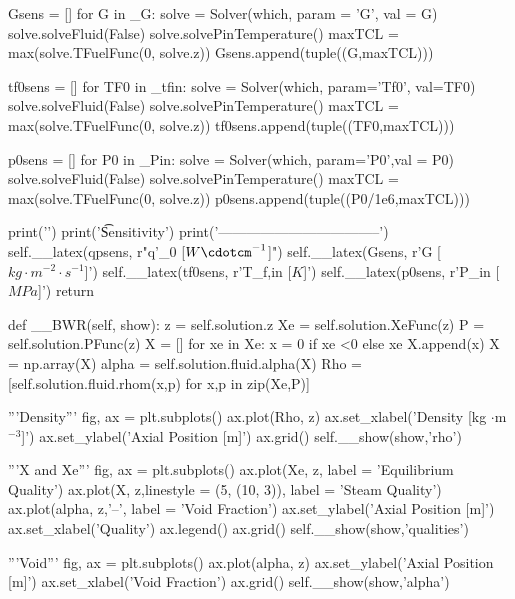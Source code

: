 \documentclass{article}
\begin{document}
\begin{python}
        Gsens = []
        for G in _G:
            solve = Solver(which, param = 'G', val = G)
            solve.solveFluid(False)
            solve.solvePinTemperature()
            maxTCL = max(solve.TFuelFunc(0, solve.z))
            Gsens.append(tuple((G,maxTCL)))

        tf0sens = []
        for TF0 in _tfin:
            solve = Solver(which, param='Tf0', val=TF0)
            solve.solveFluid(False)
            solve.solvePinTemperature()
            maxTCL = max(solve.TFuelFunc(0, solve.z))
            tf0sens.append(tuple((TF0,maxTCL)))
        
        p0sens = []
        for P0 in _Pin:
            solve = Solver(which, param='P0',val = P0)
            solve.solveFluid(False)
            solve.solvePinTemperature()
            maxTCL = max(solve.TFuelFunc(0, solve.z))
            p0sens.append(tuple((P0/1e6,maxTCL)))

        print('\n\n')
        print('\t    Sensitivity')
        print('-----------------------------------')
        self.__latex(qpsens, r"q'_{0}  [$W\cdotcm^{-1}$]")
        self.__latex(Gsens, r'G  [$kg\cdot m^{-2} \cdot s^{-1}$]')
        self.__latex(tf0sens, r'T_{f,in}  [$K$]')
        self.__latex(p0sens, r'P_{in}  [$MPa$]')
        return
    
    def __BWR(self, show):
        z = self.solution.z
        Xe = self.solution.XeFunc(z)
        P = self.solution.PFunc(z)
        X = []
        for xe in Xe:
            x = 0 if xe <0 else xe
            X.append(x)
        X = np.array(X)
        alpha = self.solution.fluid.alpha(X)
        Rho = [self.solution.fluid.rhom(x,p) for x,p in zip(Xe,P)]

        '''Density'''
        fig, ax = plt.subplots()
        ax.plot(Rho, z)
        ax.set_xlabel('Density  [kg $\cdot$m$^{-3}$]')
        ax.set_ylabel('Axial Position  [m]')
        ax.grid()
        self.__show(show,'rho')

        '''X and Xe'''
        fig, ax = plt.subplots()
        ax.plot(Xe, z, label = 'Equilibrium Quality')
        ax.plot(X, z,linestyle = (5, (10, 3)), label = 'Steam Quality')
        ax.plot(alpha, z,'--', label = 'Void Fraction')
        ax.set_ylabel('Axial Position  [m]')
        ax.set_xlabel('Quality')
        ax.legend()
        ax.grid()
        self.__show(show,'qualities')

        '''Void'''
        fig, ax = plt.subplots()
        ax.plot(alpha, z)
        ax.set_ylabel('Axial Position  [m]')
        ax.set_xlabel('Void Fraction')
        ax.grid()
        self.__show(show,'alpha')


\end{python}
\end{document}
